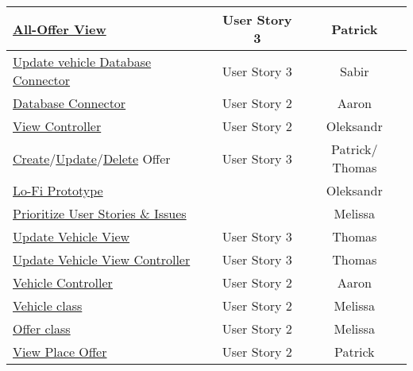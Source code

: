 \begin{tabular}{|l|c|c|}
	\hline
	\href{https://gitlab.rz.uni-bamberg.de/swt/teaching/2021-ws/swt-swl-b/group-a/-/issues/28}{All-Offer View} & User Story 3 & Patrick \\
	\hline
	\href{https://gitlab.rz.uni-bamberg.de/swt/teaching/2021-ws/swt-swl-b/group-a/-/issues/27}{Update vehicle Database Connector} & User Story 3 & Sabir \\
	\hline
	\href{https://gitlab.rz.uni-bamberg.de/swt/teaching/2021-ws/swt-swl-b/group-a/-/issues/24}{Database Connector} & User Story 2 & Aaron \\
	\hline
	\href{https://gitlab.rz.uni-bamberg.de/swt/teaching/2021-ws/swt-swl-b/group-a/-/issues/23}{View Controller} & User Story 2 & Oleksandr \\
	\hline
	\href{https://gitlab.rz.uni-bamberg.de/swt/teaching/2021-ws/swt-swl-b/group-a/-/issues/41}{Create}/\href{https://gitlab.rz.uni-bamberg.de/swt/teaching/2021-ws/swt-swl-b/group-a/-/issues/34}{Update}/\href{https://gitlab.rz.uni-bamberg.de/swt/teaching/2021-ws/swt-swl-b/group-a/-/issues/35}{Delete} Offer & User Story 3 & Patrick/ Thomas \\
	\hline
	\href{https://gitlab.rz.uni-bamberg.de/swt/teaching/2021-ws/swt-swl-b/group-a/-/issues/37}{Lo-Fi Prototype} &  & Oleksandr \\
	\hline
	\href{https://gitlab.rz.uni-bamberg.de/swt/teaching/2021-ws/swt-swl-b/group-a/-/issues/19}{Prioritize User Stories \& Issues} &  & Melissa \\
	\hline
	\href{https://gitlab.rz.uni-bamberg.de/swt/teaching/2021-ws/swt-swl-b/group-a/-/issues/25}{Update Vehicle View} & User Story 3 & Thomas \\
	\hline
	\href{https://gitlab.rz.uni-bamberg.de/swt/teaching/2021-ws/swt-swl-b/group-a/-/issues/26}{Update Vehicle View Controller} & User Story 3 & Thomas \\
	\hline
	\href{https://gitlab.rz.uni-bamberg.de/swt/teaching/2021-ws/swt-swl-b/group-a/-/issues/21}{Vehicle Controller} & User Story 2 & Aaron \\
	\hline
	\href{https://gitlab.rz.uni-bamberg.de/swt/teaching/2021-ws/swt-swl-b/group-a/-/issues/20}{Vehicle class} & User Story 2 & Melissa \\
	\hline
	\href{https://gitlab.rz.uni-bamberg.de/swt/teaching/2021-ws/swt-swl-b/group-a/-/issues/30}{Offer class} & User Story 2 & Melissa \\
	\hline
	\href{https://gitlab.rz.uni-bamberg.de/swt/teaching/2021-ws/swt-swl-b/group-a/-/issues/22}{View Place Offer} & User Story 2 & Patrick \\

\end{tabular}
